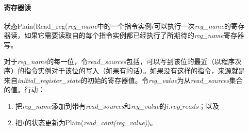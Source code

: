 \paragraph{寄存器读}\label{omm:reg_read}
状态{\sc Plain}({\sc Read\_reg}({\it reg\_name}中的一个指令实例$i$可以执行一次{\it reg\_name}的寄存器读，如果它需要读取自的每个指令实例都已经执行了所期待的{\it reg\_name}寄存器写。

对于{\it reg\_name}的每一位，令{\it read\_sources}包括，可以写到该位的最近（以程序次序）的指令实例对于该位的写入（如果有的话）。如果没有这样的指令，来源就是来自{\it initial\_register\_state}的初始的寄存器值。令{\it reg\_value}为从{\it read\_sources}集合的值。行动：
\begin{enumerate}
\item 把{\it reg\_name}添加到带有{\it read\_sources}和{\it reg\_value}的$i.\textit{reg\_reads}$；以及 %
\item 把$i$的状态更新为{\sc Plain}({\it read\_cont(reg\_value)})。 %
\end{enumerate}


